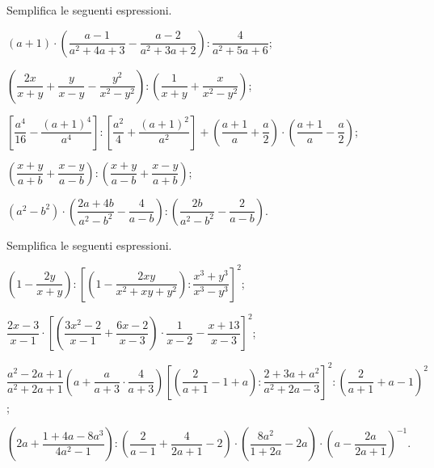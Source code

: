 \begin{esercizio}[\Ast]
\label{ese:14.61}
Semplifica le seguenti espressioni.
\begin{enumeratea}
 \item $(a+1)\cdot\left(\dfrac{a-1}{a^{2}+4a+3}-\dfrac{a-2}{a^{2}+3a+2}\right):\dfrac{4}{a^{2}+5a+6}$;
 \item $\left(\dfrac{2x}{x+y}+\dfrac{y}{x-y}-\dfrac{y^{2}}{x^{2}-y^{2}}\right):\left(\dfrac{1}{x+y}+\dfrac{x}{x^{2}-y^{2}}\right)$;
 \item $\left[\dfrac{a^{4}}{16}-\dfrac{(a+1)^{4}}{a^{4}}\right]:\left[\dfrac{a^{2}}{4}+\dfrac{(a+1)^{2}}{a^{2}}\right]+\left(\dfrac{a+1}{a}+\dfrac{a}{2}\right)\cdot\left(\dfrac{a+1}{a}-\dfrac{a}{2}\right)$;
 \item $\left(\dfrac{x+y}{a+b}+\dfrac{x-y}{a-b}\right):\left(\dfrac{x+y}{a-b}+\dfrac{x-y}{a+b}\right)$;
 \item $\left(a^{2}-b^{2}\right)\cdot\left(\dfrac{2a+4b}{a^{2}-b^{2}}-\dfrac{4}{a-b}\right):\left(\dfrac{2b}{a^{2}-b^{2}}-\dfrac{2}{a-b}\right)$.
\end{enumeratea}
\end{esercizio}

\begin{esercizio}[\Ast]
\label{ese:14.62}
Semplifica le seguenti espressioni.
\begin{enumeratea}
 \item $\left(1-\dfrac{2y}{x+y}\right):\left[\left(1-\dfrac{2xy}{x^{2}+xy+y^{2}}\right):\dfrac{x^{3}+y^{3}}{x^{3}-y^{3}}\right]^{2}$;
 \item $\dfrac{2x-3}{x-1}\cdot \left[\left(\dfrac{3x^{2}-2}{x-1}+\dfrac{6x-2}{x-3}\right)\cdot {\dfrac{1}{x-2}}-\dfrac{x+13}{x-3}\right]^{2}$;
 \item $\dfrac{a^{2}-2a+1}{a^{2}+2a+1}\left(a+\dfrac{a}{a+3}\cdot {\dfrac{4}{a+3}}\right)\left[\left(\dfrac{2}{a+1}-1+a\right):\dfrac{2+3a+a^{2}}{a^{2}+2a-3}\right]^{2}:\left(\dfrac{2}{a+1}+a-1\right)^{2}$;
 \item $\left(2a+\dfrac{1+4a-8a^{3}}{4a^{2}-1}\right):\left(\dfrac{2}{a-1}+\dfrac{4}{2a+1}-2\right)\cdot \left(\dfrac{8a^{2}}{1+2a}-2a\right)\cdot \left(a-\dfrac{2a}{2a+1}\right)^{-1}$.
\end{enumeratea}
\end{esercizio}
\pagebreak

